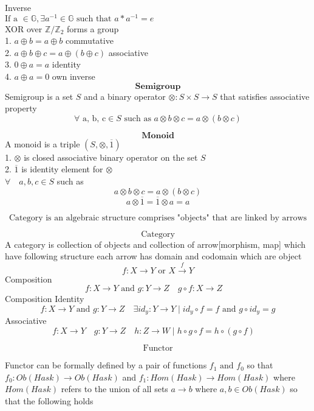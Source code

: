 \documentclass[10pt]{article}
\begin{document}
Inverse\\
$ \text{If a } \in \mathbb{G}, \exists a^{-1} \in \mathbb{G} \text{ such that } a*a^{-1} = e $\\

XOR over $\mathbb{Z}/\mathbb{Z}_2$ forms a group\\
1. $ a \oplus b = a \oplus b $ commutative\\ 
2. $ a \oplus b \oplus c = a \oplus (b \oplus c) $ associative\\ 
3. $ 0 \oplus a = a $ identity\\ 
4. $ a \oplus a = 0 $ own inverse\\  

\[ \textbf{ Semigroup } \]
Semigroup is a set $S$ and a binary operator $\otimes \colon S \times S \rightarrow S$ that satisfies 
associative property\\ 
\[ \forall \text{ a, b, c} \in S \text{ such as } a \otimes b\otimes c = a \otimes (b \otimes c) \]

\[ \textbf{ Monoid } \]
A monoid is a triple $(S, \otimes, \overline{1})$ \\
1. $\otimes$ is closed associative binary operator on the set $S$ \\
2. $\overline{1}$ is identity element for $\otimes$ \\
$\forall\quad a, b, c \in S$ such as\\
\[ a \otimes b  \otimes c = a \otimes (b \otimes c)   \]
\[ a \otimes \overline{1} = \overline{1} \otimes a =  a  \]

\newpage
\[ \text{Category is an algebraic structure comprises "objects" that are linked by arrows} \] 

\[ \text{ Category } \]
A category is collection of objects and collection of arrow[morphism, map] which have following structure
each arrow has domain and codomain which are object     
\[ f \colon X \rightarrow Y \text{ or } X \xrightarrow{f} Y\]
Composition
\[ f \colon X \rightarrow Y \text{ and } g \colon Y \rightarrow Z \quad g \circ f \colon X \rightarrow Z \quad \]
Composition Identity
\[ f \colon X \rightarrow Y \text{ and } g \colon Y \rightarrow Z  \quad \exists id_y \colon Y \rightarrow Y \mid id_y \circ f = f \text{ and } g \circ id_y = g \]
Associative
\[ f \colon X \rightarrow Y \quad g \colon Y \rightarrow Z \quad h \colon Z \rightarrow W \mid h \circ g \circ f = h \circ (g \circ f) \quad \]

\[ \text{Functor} \]

Functor can be formally defined by a pair of functions $f_1 \mbox{ and } f_0$ 
so that $f_0:Ob(Hask) \rightarrow Ob(Hask)$ and $f_1:Hom(Hask) \rightarrow Hom(Hask)$
where $Hom(Hask)$ refers to the union of all sets $a \rightarrow b$ where $a, b \in Ob(Hask)$
so that the following holds \\
\end{document}

